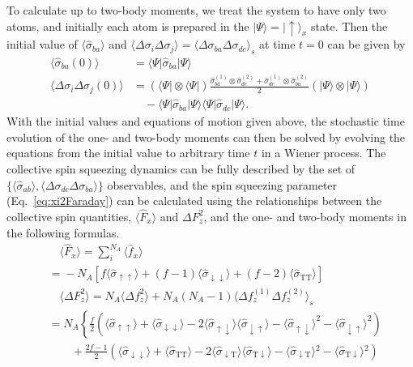 \documentclass[aps,pra,twocolumn,superscriptaddress]{revtex4-1} %
\def\bra#1{\langle{#1}\rvert}%
\def\ket#1{\lvert{#1}\rangle}%
\newcommand{\nn}{\nonumber}
\newcommand{\expect}[1]{\big\langle #1 \big\rangle}
\newcommand{\sigmauu}{\hat{\sigma}_{\uparrow\uparrow}}
\newcommand{\sigmaud}{\hat{\sigma}_{\uparrow\downarrow}}
\newcommand{\sigmadu}{\hat{\sigma}_{\downarrow\uparrow}}
\newcommand{\sigmadd}{\hat{\sigma}_{\downarrow\downarrow}}
\newcommand{\sigmadt}{\hat{\sigma}_{\downarrow \mathrm{T}}}
\newcommand{\sigmatd}{\hat{\sigma}_{\mathrm{T}\downarrow}}
\newcommand{\sigmatt}{\hat{\sigma}_{\mathrm{T}\mathrm{T}}}
\begin{document}
\begin{appendix}
To calculate up to two-body moments, we treat the system to have only two atoms, and initially each atom is prepared in the $ \ket{\Psi}=\ket{\uparrow}_x $ state. Then the initial value of $ \expect{\hat{\sigma}_{ba} } $ and $ \expect{\Delta\sigma_i\Delta\sigma_j}=\expect{\Delta\sigma_{ba}\Delta\sigma_{dc}}_s $ at time $ t=0 $ can be given by
\begin{subequations}
\begin{align}
\expect{\hat{\sigma}_{ba}(0)}&=\bra{\Psi}\hat{\sigma}_{ba}\ket{\Psi}\\
\expect{\!\Delta\sigma\!_i\Delta\sigma\!_j(0)} &=\! (\bra{\Psi}\!\otimes\!\bra{\Psi})\frac{\hat{\sigma}_{ba}^{(\!1\!)} \!\otimes\!\hat{\sigma}_{dc}^{(\!2\!)}\!+\!\hat{\sigma}_{dc}^{(\!1\!)} \!\otimes\!\hat{\sigma}_{ba}^{(\!2\!)}}{2}(\ket{\Psi}\!\otimes\!\ket{\Psi}\!)\nn\\
&\quad-\bra{\Psi}\hat{\sigma}_{ba}\ket{\Psi}\bra{\Psi}\hat{\sigma}_{dc}\ket{\Psi}.
\end{align}
\end{subequations}
With the initial values and equations of motion given above, the stochastic time evolution of the one- and two-body moments can then be solved by evolving the equations from the initial value to arbitrary time $ t $ in a Wiener process. The collective spin squeezing dynamics can be fully described by the set of $ \{\expect{\hat{\sigma}_{ab}},\expect{\Delta\sigma_{dc}\Delta\sigma_{ba}}\} $ observables, and the spin squeezing parameter (Eq.~\eqref{eq:xi2Faraday}) can be calculated using the relationships between the collective spin quantities, $ \expect{\hat{F}_x} $ and $ \Delta F_z^2 $, and the one- and two-body moments in the following formulas.
\begin{subequations}
	\begin{align}
	&\quad \expect{\hat{F}_x} = \sum_i^{N_A}\expect{\hat{f}_x}\nonumber\\
	&= \!-N_A\! \left[f\expect{\!\sigmauu\!}\!+\!(f\!-\!1)\expect{\!\sigmadd\!}\!+\!(f\!-\!2)\expect{\!\sigmatt\! } \right]\label{eq:Fx_qutrit}\\
	&\quad\expect{\Delta F_z^2} = N_A\expect{\Delta f_z^2} + N_A(N_A-1)\expect{\Delta f_z^{(1)}\Delta f_z^{(2)} }_s\label{eq:DeltaFz2_fz}\\
	&=\!N_A\!\left\{\! \frac{f}{2}\!\left(\!\expect{\!\sigmauu\!}\!+\!\expect{\!\sigmadd}\!-\!2\expect{\!\sigmaud}\expect{\!\sigmadu\!}\!-\!\expect{\!\sigmaud}^2\!-\!\expect{\!\sigmadu\!}^2 \right)\right. \nn\\
	&\quad\quad+\! \frac{2f-1}{2}\!\!\left(\!\expect{\!\sigmadd}\!+\!\expect{\!\sigmatt\!}\!\!-\!2\expect{\!\sigmadt\!}\expect{\!\sigmatd}\!\!-\!\expect{\!\sigmadt\!}\!^2\!\!-\!\expect{\!\sigmatd}\!^2 \right)\nn\\

\end{align}
\end{subequations}
\end{appendix}
\end{document}
